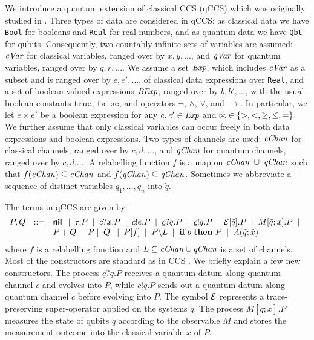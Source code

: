 \documentclass[runningheads]{llncs}
\def\ra{\ensuremath{\rightarrow}}
\newcommand{\qc}{\underline{c}}
\newcommand{\qd}{\underline{d}}
\newcommand{\cVar}{{\it cVar}}
\newcommand{\qVar}{{\it qVar}}
\newcommand{\cChan}{{\it cChan}}
\newcommand{\qChan}{{\it qChan}}
\newcommand{\CE}{{\cal E}}
\newcommand{\ifthen}[2]{{\textbf{if} ~#1~ \textbf{then} ~#2}}
\begin{document}
We introduce a quantum extension of classical CCS (qCCS) which was originally studied in \cite{FDJY07,YFDJ09,FDY11}. Three types of data are considered in qCCS: as classical data we have \texttt{Bool} for booleans and \texttt{Real} for real numbers, and as quantum data we have \texttt{Qbt} for qubits. Consequently,
two countably infinite sets of variables are assumed: $\cVar$ for classical variables, ranged over by $x,y,...$, and $\qVar$ for quantum variables, ranged over by $q,r,...$.
We assume a set ${\it Exp}$, which includes $\cVar$ as a subset and is ranged over by $e,e',\dots$,  of classical data expressions over
\texttt{Real}, and a set of boolean-valued expressions ${\it BExp}$, ranged over by $b, b',\dots$, with the usual boolean constants $\texttt{true}$, $\texttt{false}$, and operators
$\neg$, $\wedge$, $\vee$, and $\ra$. In particular, we let $e\bowtie e'$ be a boolean expression for any $e,e'\in {\it Exp}$ and ${\bowtie} \in\{ {>, <, \geq, \leq, =} \}$.
We further assume that only classical variables can occur freely in both data expressions and boolean expressions.
Two types of channels are used: $\cChan$ for classical channels, ranged over by $c,d,...$, and $\qChan$ for quantum channels, ranged over by $\qc,\qd$,.... A relabelling function $f$ is a map on $\cChan\; \cup\; \qChan$ such that $f(\cChan)\subseteq \cChan$ and $f(\qChan)\subseteq \qChan$.
Sometimes we abbreviate a sequence of distinct variables $q_1,...,q_n$ into $\tilde{q}$.

The terms in qCCS are given by:
\[\begin{array}{rcl}
P,Q &::=& \Cnil \BNFsep \tau.P \BNFsep c?x.P \BNFsep c!e.P
\BNFsep \qc?q.P \BNFsep
\qc!q.P \BNFsep \CE[\tilde{q}].P
\BNFsep M[\tilde{q};x].P \BNFsep \\
& & P + Q \BNFsep  P \Cpar Q\;
\BNFsep P[f] \BNFsep P\backslash L \BNFsep \ifthen{b}{P} \BNFsep
A(\tilde{q};\tilde{x})
\end{array}\]
where $f$ is a relabelling function and $L\subseteq \cChan\cup \qChan$ is a set of channels.
Most of the constructors are standard as in CCS \cite{ccs}.
We briefly explain a few new constructors. The process $\qc?q.P$ receives a quantum datum along quantum channel $\qc$ and evolves into $P$, while $\qc!q.P$ sends out a quantum datum along quantum channel $\qc$ before evolving into $P$. The symbol $\CE$ represents a trace-preserving super-operator applied on the systems $\tilde{q}$. The process $M[\widetilde{q};x].P$ measures the state of qubits $\widetilde{q}$
according to the observable $M$ and stores the measurement outcome into the
classical variable $x$ of $P$.
\end{document}
